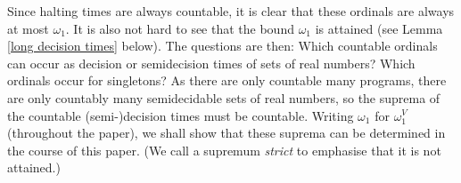 \documentclass[a4paper,11pt]{amsart}
\theoremstyle{definition}
\newtheorem*{problem A}{Problem 1}
\newtheorem*{problem B}{Problem 2}
\theoremstyle{remark}
\begin{document}





Since halting times are always countable, it is clear that these ordinals are always at most $\omega_{1}$. It is also not hard to see that the bound $\omega_{1}$ is attained (see Lemma \ref{long decision times} below). 
The questions are then: 
Which countable ordinals can occur as decision or semidecision times of sets of real numbers? 
Which ordinals occur for singletons? 
As there are only countable many programs, there are only countably many semidecidable sets of real numbers, so the suprema of the countable (semi-)decision times must be countable. 
Writing $\omega_1$ for $\omega_1^V$ (throughout the paper), we shall show that these
suprema can be determined in the course of this paper. (We call a supremum \emph{strict} to emphasise that it is not attained.)
\end{document}
